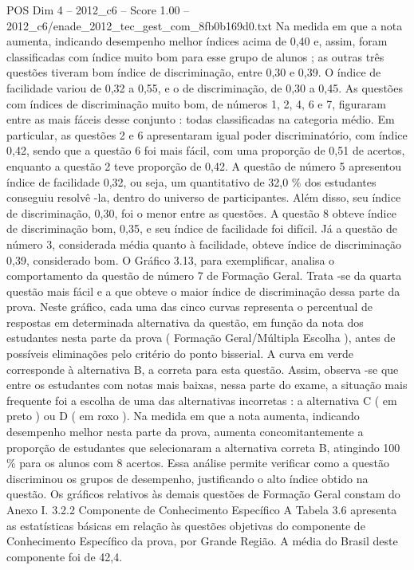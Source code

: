 \begin{textsample}{POS Dim 4 – 2012\_c6 – Score 1.00 – 2012\_c6/enade\_2012\_tec\_gest\_com\_8fb0b169d0.txt}
Na medida em que a nota aumenta, indicando desempenho melhor índices acima de 0,40 e, assim, foram classificadas com índice muito bom para esse grupo de alunos ; as outras três questões tiveram bom índice de discriminação, entre 0,30 e 0,39.
O índice de facilidade variou de 0,32 a 0,55, e o de discriminação, de 0,30 a 0,45.
As questões com índices de discriminação muito bom, de números 1, 2, 4, 6 e 7, figuraram entre as mais fáceis desse conjunto : todas classificadas na categoria médio.
Em particular, as questões 2 e 6 apresentaram igual poder discriminatório, com índice 0,42, sendo que a questão 6 foi mais fácil, com uma proporção de 0,51 de acertos, enquanto a questão 2 teve proporção de 0,42.
A questão de número 5 apresentou índice de facilidade 0,32, ou seja, um quantitativo de 32,0 \% dos estudantes conseguiu resolvê -la, dentro do universo de participantes.
Além disso, seu índice de discriminação, 0,30, foi o menor entre as questões.
A questão 8 obteve índice de discriminação bom, 0,35, e seu índice de facilidade foi difícil.
Já a questão de número 3, considerada média quanto à facilidade, obteve índice de discriminação 0,39, considerado bom.
O Gráfico 3.13, para exemplificar, analisa o comportamento da questão de número 7 de Formação Geral.
Trata -se da quarta questão mais fácil e a que obteve o maior índice de discriminação dessa parte da prova.
Neste gráfico, cada uma das cinco curvas representa o percentual de respostas em determinada alternativa da questão, em função da nota dos estudantes nesta parte da prova ( Formação Geral/Múltipla Escolha ), antes de possíveis eliminações pelo critério do ponto bisserial.
A curva em verde corresponde à alternativa B, a correta para esta questão.
Assim, observa -se que entre os estudantes com notas mais baixas, nessa parte do exame, a situação mais frequente foi a escolha de uma das alternativas incorretas : a alternativa C ( em preto ) ou D ( em roxo ).
Na medida em que a nota aumenta, indicando desempenho melhor nesta parte da prova, aumenta concomitantemente a proporção de estudantes que selecionaram a alternativa correta B, atingindo 100 \% para os alunos com 8 acertos.
Essa análise permite verificar como a questão discriminou os grupos de desempenho, justificando o alto índice obtido na questão.
Os gráficos relativos às demais questões de Formação Geral constam do Anexo I. 3.2.2 Componente de Conhecimento Específico A Tabela 3.6 apresenta as estatísticas básicas em relação às questões objetivas do componente de Conhecimento Específico da prova, por Grande Região.
A média do Brasil deste componente foi de 42,4.

\end{textsample}
